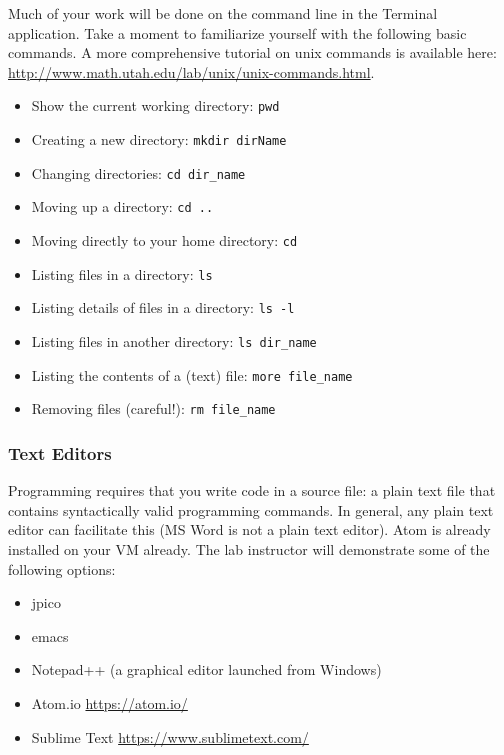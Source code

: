 \documentclass[12pt]{scrartcl}
\begin{document}
Much of your work will be done on the command line in the Terminal application.  Take a moment to 
familiarize yourself with the following basic commands.  A more comprehensive 
tutorial on unix commands is available here: \url{http://www.math.utah.edu/lab/unix/unix-commands.html}.
\begin{itemize}
  \item Show the current working directory: \texttt{pwd}
  \item Creating a new directory: \texttt{mkdir dirName}
  \item Changing directories: \texttt{cd dir_name}
  \item Moving up a directory: \texttt{cd ..}
  \item Moving directly to your home directory: \texttt{cd ~}
  \item Listing files in a directory: \texttt{ls}
  \item Listing details of files in a directory: \texttt{ls -l}
  \item Listing files in another directory: \texttt{ls dir_name}
  \item Listing the contents of a (text) file: \texttt{more file_name}
  \item Removing files (careful!):  \texttt{rm file_name}
\end{itemize}

\subsubsection*{Text Editors}

Programming requires that you write code in a source file: a plain text file that 
contains syntactically valid programming commands.  In general, any plain 
text editor can facilitate this (MS Word is not a plain text editor). Atom is already installed on your VM already. The lab 
instructor will demonstrate some of the following options: 
\begin{itemize}
  \item jpico
  \item emacs
  \item Notepad++ (a graphical editor launched from Windows)
  \item Atom.io \url{https://atom.io/}
  \item Sublime Text \url{https://www.sublimetext.com/}
\end{itemize}
\end{document}
